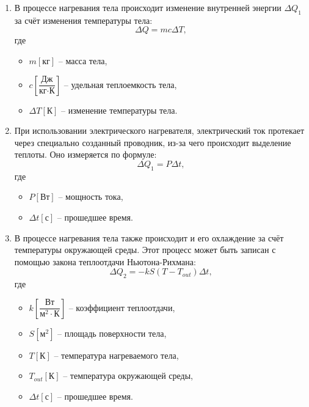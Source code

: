 	\begin{enumerate}
		\item В процессе нагревания тела происходит изменение внутренней энергии \( \Delta Q_1 \) за счёт изменения температуры тела:
		\begin{equation}
			\Delta Q = mc \Delta T, \label{Q1}
		\end{equation} где \begin{itemize}
			\item \( m \left[\text{кг} \right] \) -- масса тела,
			\item \( c \left[\dfrac{\text{Дж}}{\text{кг} \cdot \text{К}} \right] \) -- удельная теплоемкость тела,
			\item \( \Delta T \left[\text{К} \right] \) -- изменение температуры тела.
		\end{itemize}

		\item При использовании электрического нагревателя, электрический ток протекает через специально созданный проводник, из-за чего происходит выделение теплоты. Оно измеряется по формуле:
		\begin{equation}
			\Delta Q_1 = P \Delta t,
		\end{equation} где \begin{itemize}
			\item \( P \left[\text{Вт} \right] \) -- мощность тока,
			\item \( \Delta t\left[\text{с} \right]  \) -- прошедшее время.
		\end{itemize}

		\item В процессе нагревания тела также происходит и его охлаждение за счёт температуры окружающей среды. Этот процесс может быть записан с помощью закона теплоотдачи Ньютона-Рихмана:
		\begin{equation}
			\Delta Q_2 = -kS \left( T - T_{out} \right) \Delta t,
		\end{equation} где \begin{itemize}
			\item \( k \left[\dfrac{\text{Вт}}{\text{м}^2 \cdot \text{К}} \right] \) -- коэффициент теплоотдачи,
			\item \( S \left[\text{м}^2 \right] \) -- площадь поверхности тела,
			\item \( T \left[\text{К} \right] \) -- температура нагреваемого тела,
			\item \( T_{out} \left[\text{К} \right] \) -- температура окружающей среды,
			\item \( \Delta t \left[\text{с} \right] \) -- прошедшее время.
		\end{itemize}


\end{enumerate}
